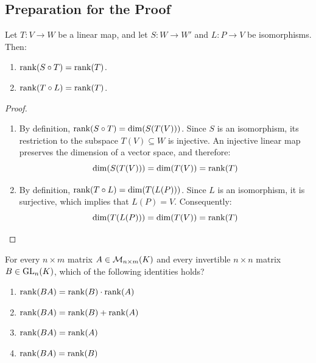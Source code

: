 \subsection{Preparation for the Proof}

\begin{lemma}
\label{lemma:rank_invariance_isomorphisms}
Let $T: V \to W$ be a linear map, and let $S: W \to W'$ and $L: P \to V$ be isomorphisms. Then:
\begin{enumerate}[label=\textbf{(\alph*)}]
    \item $\operatorname{rank}(S \circ T) = \operatorname{rank}(T)$.
    \item $\operatorname{rank}(T \circ L) = \operatorname{rank}(T)$.
\end{enumerate}
\end{lemma}

\begin{proof}
\begin{enumerate}[label=\textbf{(\alph*)}]
    \item By definition, $\operatorname{rank}(S \circ T) = \dim (S(T(V)))$. Since $S$ is an isomorphism, its restriction to the subspace $T(V) \subseteq W$ is injective. An injective linear map preserves the dimension of a vector space, and therefore:
    \begin{equation*}
        \dim (S(T(V))) = \dim (T(V)) = \operatorname{rank}(T)
    \end{equation*}

    \item By definition, $\operatorname{rank}(T \circ L) = \dim (T(L(P)))$. Since $L$ is an isomorphism, it is surjective, which implies that $L(P) = V$. Consequently:
    \begin{equation*}
        \dim (T(L(P))) = \dim (T(V)) = \operatorname{rank}(T)
    \end{equation*}
\end{enumerate}
\end{proof}

\begin{exercise}
\label{exc:rank_invariance_invertible_matrix_sc}
For every $n \times m$ matrix $A \in \mathcal{M}_{n \times m}(K)$ and every invertible $n \times n$ matrix $B \in \operatorname{GL}_n(K)$, which of the following identities holds?
\begin{enumerate}
    \item $\operatorname{rank}(BA) = \operatorname{rank}(B) \cdot \operatorname{rank}(A)$
    \item $\operatorname{rank}(BA) = \operatorname{rank}(B) + \operatorname{rank}(A)$
    \item $\operatorname{rank}(BA) = \operatorname{rank}(A)$
    \item $\operatorname{rank}(BA) = \operatorname{rank}(B)$
\end{enumerate}
\end{exercise}

